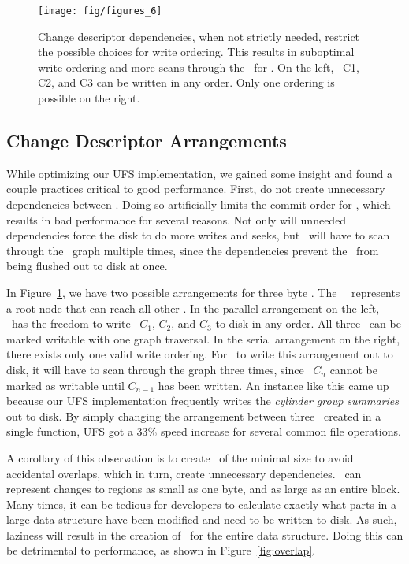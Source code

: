 \begin{figure}[htb]
  \centering
  \texttt{[image: fig/figures\_6]}
  \caption{\label{fig:chdescarrange} Change descriptor dependencies, when
  not strictly needed, restrict the possible choices for write ordering.
  This results in suboptimal write ordering and more scans through the
  \chdescs\ for \Kudos. On the left, \chdescs\ C1, C2, and C3 can be written
  in any order. Only one ordering is possible on the right.}
\end{figure}

\subsection {Change Descriptor Arrangements}
\label{sec:arrangements}
While optimizing our UFS implementation, we gained some insight and found a
couple practices critical to good performance. First, do not create unnecessary
dependencies between \chdescs. Doing so artificially limits the commit order
for \chdescs, which results in bad performance for several reasons. Not only
will unneeded dependencies force the disk to do more writes and seeks, but
\Kudos\ will have to scan through the \chdesc\ graph multiple times, since the
dependencies prevent the \chdescs\ from being flushed out to disk at once.

In Figure~\ref{fig:chdescarrange}, we have two possible arrangements for three
byte \chdescs. The \noop\ \chdesc\ represents a root node that can reach all
other \chdescs. In the parallel arrangement on the left, \Kudos\ has the
freedom to write \chdescs\ $C_1$, $C_2$, and $C_3$ to disk in any order. All
three \chdescs\ can be marked writable with one graph traversal. In the serial
arrangement on the right, there exists only one valid write ordering. For
\Kudos\ to write this arrangement out to disk, it will have to scan through
the graph three times, since \chdesc\ $C_n$ cannot be marked as writable until
$C_{n-1}$ has been written.
An instance like this came up because our UFS implementation frequently writes
the \emph{cylinder group summaries} out to disk. By simply changing the
arrangement between three \chdescs\ created in a single function, UFS got a
33\% speed increase for several common file operations.

A corollary of this observation is to create \chdescs\ of the minimal size to
avoid accidental overlaps, which in turn, create unnecessary dependencies.
\Chdescs\ can represent changes to regions as small as one byte, and as large
as an entire block. Many times, it can be tedious for developers to calculate
exactly what parts in a large data structure have been modified and need to be
written to disk. As such, laziness will result in the creation of \chdescs\
for the entire data structure. Doing this can be detrimental to performance,
as shown in Figure~\ref{fig:overlap}.


